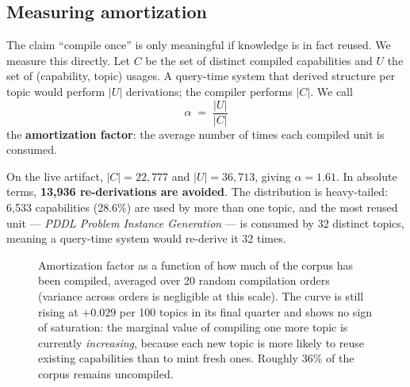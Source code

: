 \documentclass[10pt,a4paper]{article}
\begin{document}
\subsection{Measuring amortization}
\label{sec:amort}

The claim ``compile once'' is only meaningful if knowledge is in fact reused. We
measure this directly. Let $C$ be the set of distinct compiled capabilities and
$U$ the set of (capability, topic) usages. A query-time system that derived
structure per topic would perform $|U|$ derivations; the compiler performs
$|C|$. We call
\[
\alpha \;=\; \frac{|U|}{|C|}
\]
the \textbf{amortization factor}: the average number of times each compiled unit
is consumed.

On the live artifact, $|C| = 22{,}777$ and $|U| = 36{,}713$, giving
$\alpha = 1.61$. In absolute terms, \textbf{13{,}936 re-derivations are avoided}.
The distribution is heavy-tailed: 6{,}533 capabilities (28.6\%) are used by more
than one topic, and the most reused unit --- \emph{PDDL Problem Instance
Generation} --- is consumed by 32 distinct topics, meaning a query-time system
would re-derive it 32 times.

\begin{figure}[htbp]
\centering
{}
\caption{Amortization factor as a function of how much of the corpus has been
compiled, averaged over 20 random compilation orders (variance across orders is
negligible at this scale). The curve is still rising at
$+0.029$ per 100 topics in its final quarter and shows no sign of saturation:
the marginal value of compiling one more topic is currently \emph{increasing},
because each new topic is more likely to reuse existing capabilities than to
mint fresh ones. Roughly 36\% of the corpus remains uncompiled.}
\label{fig:amort}
\end{figure}
\end{document}
